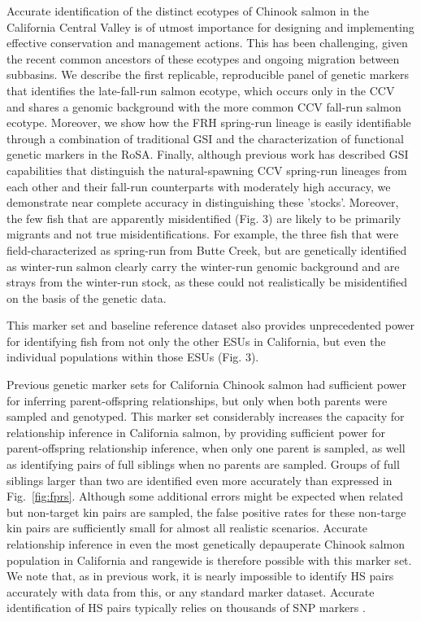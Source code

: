 Accurate identification of the distinct ecotypes of Chinook salmon in the
California Central Valley is of utmost importance for designing and implementing
effective conservation and management actions. This has been challenging,
given the recent common ancestors of these ecotypes and ongoing migration between subbasins.
We describe the first replicable, reproducible panel of genetic markers that identifies the late-fall-run salmon ecotype,
which occurs only in the CCV and shares a genomic background with the more
common CCV fall-run salmon ecotype. Moreover, we show how the FRH spring-run lineage is
easily identifiable through a combination of traditional GSI and the characterization
of functional genetic markers in the RoSA. Finally, although previous work has described
GSI capabilities that distinguish the natural-spawning CCV spring-run lineages from
each other and their fall-run counterparts with moderately high accuracy, we demonstrate
near complete accuracy in distinguishing these 'stocks'. Moreover, the few fish that are
apparently misidentified (Fig. 3) are likely to be primarily migrants and not true misidentifications.
For example, the three fish that were field-characterized as spring-run from Butte Creek, but are
genetically identified as winter-run salmon clearly carry the winter-run genomic background and
are strays from the winter-run stock, as these 
could not realistically be misidentified on the basis of the genetic data.

This marker set and baseline reference dataset also provides
unprecedented power for identifying fish from not only the other ESUs in California,
but even the individual populations within those ESUs (Fig. 3).

Previous genetic marker sets for California Chinook salmon had sufficient power for inferring
parent-offspring relationships, but only when both parents were sampled and genotyped.
This marker set considerably increases the capacity for relationship inference in California
salmon, by providing sufficient power for parent-offspring relationship inference, when only
one parent is sampled, as well as identifying pairs of full siblings when no parents are sampled.
Groups of full siblings larger than two are identified even more accurately than expressed in Fig.~\ref{fig:fprs}.
Although some additional errors might be
expected when related but non-target kin pairs are sampled,  the false positive rates
for these non-targe kin pairs are sufficiently small
for almost all realistic scenarios.
Accurate relationship
inference in even the most genetically depauperate Chinook salmon population in California
and rangewide \citep{seeb2007development,clemento2014evaluation} is therefore possible with this marker set.
We note that, as in previous work, it is nearly impossible to identify HS pairs accurately
with data from this, or any standard marker dataset. Accurate identification of HS pairs
typically relies on thousands of SNP markers \citep{hillary2018genetic}. 

